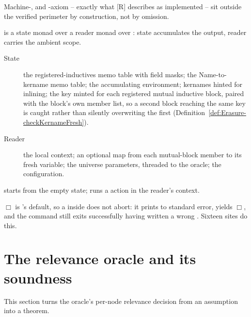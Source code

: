 \begin{remark}
 Machine-,  and -axiom -- exactly what [R]
describes as implemented -- sit outside the verified perimeter by construction, not by omission.
\end{remark}

\begin{definition}
\label{def:Erasure-EraseM}
\leanok
{}  is a state monad over a reader monad over : state
accumulates the output, reader carries the ambient scope.
\begin{description}
\item[State] the registered-inductives memo table with field masks; the Name-to-kername memo
table; the accumulating \lbox{} environment; kernames hinted for inlining; the \lbox{} key
minted for each registered mutual inductive block, paired with the block's own member list, so a
second block reaching the same key is caught rather than silently overwriting the first
(Definition~\ref{def:Erasure-checkKernameFresh}).
\item[Reader] the local context; an optional map from each mutual-block member to its fresh
variable; the universe parameters, threaded to the oracle; the configuration.
\end{description}
  starts from the empty state;  runs a 
action in the reader's context.
\end{definition}

\begin{remark}
 $\Box$ is 's  default, so a  inside
 does not abort: it prints to standard error, yields $\Box$, and the command still
exits successfully having written a wrong . Sixteen sites do this.
\end{remark}

\section{The relevance oracle and its soundness}
\label{sec:eraser:oracle}
This section turns the oracle's per-node relevance decision from an assumption into a theorem.

